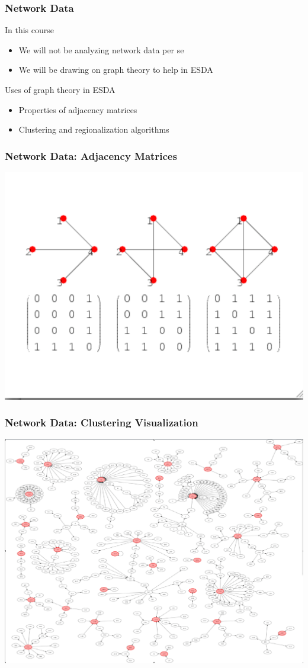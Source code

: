 \documentclass[nototal,handout]{beamer}
\begin{document}
\begin{frame}[<+->]
    \frametitle{Network Data}
	\begin{block}{In this course}
  \begin{itemize}
	    \item We will not be analyzing network data per se
	    \item We will be drawing on graph theory to help in ESDA
	  \end{itemize}
	\end{block}
	\begin{block}{Uses of graph theory in ESDA}
	  \begin{itemize}
	    \item Properties of adjacency matrices
	    \item Clustering and regionalization algorithms
	  \end{itemize}
	 \end{block}
  \end{frame}

\begin{frame}
    \frametitle{Network Data: Adjacency Matrices}
    \begin{center}
      \includegraphics[width=.65\linewidth]{AdjacencyMatrix.pdf}
    \end{center}
  \end{frame}


\begin{frame}
    \frametitle{Network Data: Clustering Visualization}
    \begin{center}
      \includegraphics[width=.65\linewidth]{clusternetwork.pdf}
    \end{center}
  \end{frame}
\end{document}
